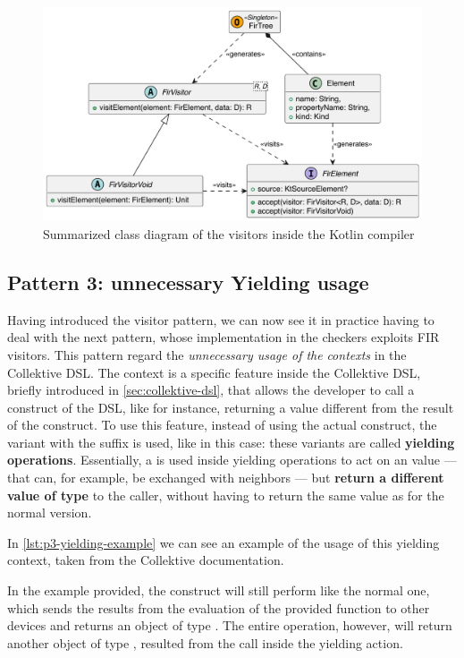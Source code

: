 \documentclass[12pt,a4paper,openright,twoside]{book}
\begin{document}
\begin{figure}
  \centering
  \includegraphics[width=.7\linewidth]{figures/fir-visitors.pdf}
  \caption{Summarized class diagram of the visitors inside the Kotlin 
  compiler}
  \label{fig:fir-visitors-class-diagram}
\end{figure}

\subsection{Pattern 3: unnecessary Yielding usage}

Having introduced the visitor pattern, we can now see it in practice having 
to deal with the next pattern, whose implementation in the checkers exploits
\ac{FIR} visitors. This pattern regard the \emph{unnecessary usage of the} 
 \emph{contexts} in the Collektive \ac{DSL}. 
%
The  context is a specific feature inside the Collektive
\ac{DSL}, briefly introduced in \cref{sec:collektive-dsl}, that allows the
developer to call a construct of the \ac{DSL}, like  for
instance, returning a value different from the result of the construct. To use
this feature, instead of using the actual construct, the variant with the
 suffix is used, like  in this case: these variants
are called \textbf{yielding operations}. 
%
Essentially, a  is used inside
yielding operations to act on an  value --- that can, for
example, be exchanged with neighbors --- but \textbf{return a different value of
type}  to the caller, without having to return the same value
as for the normal version.

In \cref{lst:p3-yielding-example} we can see an example of the usage of this
yielding context, taken from the Collektive documentation. 
%

%
In the example provided, the  construct will still perform like
the normal one, which sends the results from the evaluation of the provided
function to other devices and returns an object of type .
The entire operation, however, will return another object of type
, resulted from the  call inside the yielding
action.
\end{document}

